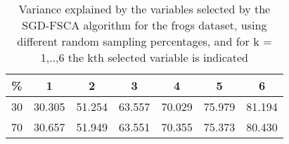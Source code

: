 \begin{table}
	\begin{center}
		\begin{tabular}{c c c c c c c}
			\% & 1 & 2 & 3 & 4 & 5 & 6 \\
			\hline
			30 & 30.305 & 51.254 & 63.557 & 70.029 & 75.979 & 81.194 \\
			70 & 30.657 & 51.949 & 63.551 & 70.355 & 75.373 & 80.430 \\
		\end{tabular}
	\end{center}
	\caption{Variance explained by the variables selected by the SGD-FSCA algorithm for the frogs dataset, using different random sampling percentages, and for k = 1,..,6 the kth selected variable is indicated}
\end{table}